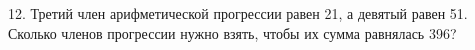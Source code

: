 12. Третий член арифметической прогрессии равен 21, а девятый равен 51. Сколько членов прогрессии нужно взять, чтобы их сумма равнялась 396?\\
